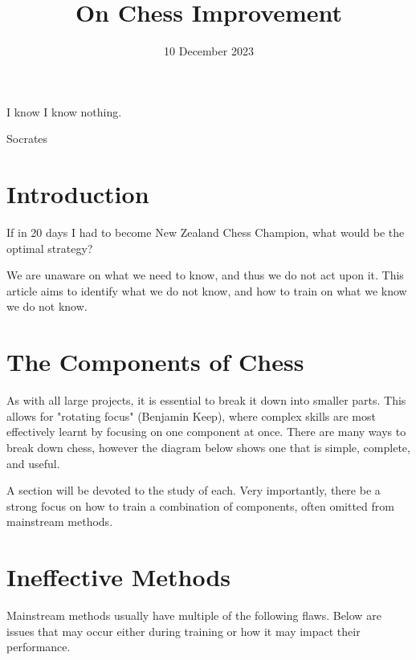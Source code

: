\documentclass{article}
\title{On Chess Improvement}
\date{10 December 2023}
\begin{document}
\maketitle
\epigraph{I know I know nothing.}{Socrates}
\tableofcontents


\section{Introduction}
If in 20 days I had to become New Zealand Chess Champion, what would be the optimal strategy?

We are unaware on what we need to know, and thus we do not act upon it. This article aims to identify what we do not know, and how to train on what we know we do not know.

\section{The Components of Chess}
As with all large projects, it is essential to break it down into smaller parts. This allows for "rotating focus" (Benjamin Keep), where complex skills are most effectively learnt by focusing on one component at once. There are many ways to break down chess, however the diagram below shows one that is simple, complete, and useful. \\

\begin{center}
\end{center}

A section will be devoted to the study of each. Very importantly, there be a strong focus on how to train a combination of components, often omitted from mainstream methods.


\section{Ineffective Methods}
Mainstream methods usually have multiple of the following flaws. Below are issues that may occur either during training or how it may impact their performance.
\end{document}
